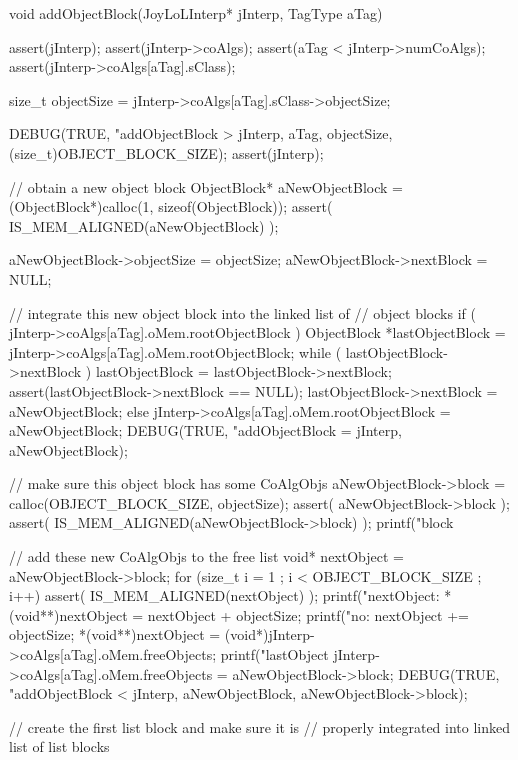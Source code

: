 \startCCode
void addObjectBlock(JoyLoLInterp* jInterp, TagType aTag) {
  assert(jInterp);
  assert(jInterp->coAlgs);
  assert(aTag < jInterp->numCoAlgs);
  assert(jInterp->coAlgs[aTag].sClass);

  size_t objectSize = jInterp->coAlgs[aTag].sClass->objectSize;

  DEBUG(TRUE, "addObjectBlock > %
    jInterp, aTag, objectSize, (size_t)OBJECT_BLOCK_SIZE);
  assert(jInterp);
  
  // obtain a new object block
  ObjectBlock* aNewObjectBlock = 
    (ObjectBlock*)calloc(1, sizeof(ObjectBlock));
  assert( IS_MEM_ALIGNED(aNewObjectBlock) );

  aNewObjectBlock->objectSize = objectSize;
  aNewObjectBlock->nextBlock  = NULL;
  
  // integrate this new object block into the linked list of
  // object blocks
  if ( jInterp->coAlgs[aTag].oMem.rootObjectBlock ) {
    ObjectBlock *lastObjectBlock = jInterp->coAlgs[aTag].oMem.rootObjectBlock;
    while ( lastObjectBlock->nextBlock ) {
      lastObjectBlock = lastObjectBlock->nextBlock;
    }
    assert(lastObjectBlock->nextBlock == NULL);
    lastObjectBlock->nextBlock = aNewObjectBlock;
  } else {
    jInterp->coAlgs[aTag].oMem.rootObjectBlock = aNewObjectBlock;
  }
  DEBUG(TRUE, "addObjectBlock = %
    jInterp, aNewObjectBlock);

  // make sure this object block has some CoAlgObjs
  aNewObjectBlock->block = 
    calloc(OBJECT_BLOCK_SIZE, objectSize);
  assert( aNewObjectBlock->block );
  assert( IS_MEM_ALIGNED(aNewObjectBlock->block) );
  printf("block %
  
  // add these new CoAlgObjs to the free list
  void* nextObject = aNewObjectBlock->block;
  for (size_t i = 1 ; i < OBJECT_BLOCK_SIZE ; i++) {
    assert( IS_MEM_ALIGNED(nextObject) );
    printf("nextObject: %
    *(void**)nextObject = nextObject + objectSize;
    printf("no: %
    nextObject += objectSize;
  }
  *(void**)nextObject =
    (void*)jInterp->coAlgs[aTag].oMem.freeObjects;
  printf("lastObject %
  jInterp->coAlgs[aTag].oMem.freeObjects = aNewObjectBlock->block;
  DEBUG(TRUE, "addObjectBlock < %
    jInterp, aNewObjectBlock, aNewObjectBlock->block);
}
\stopCCode

\startCTest
  // create the first list block and make sure it is 
  // properly integrated into linked list of list blocks

